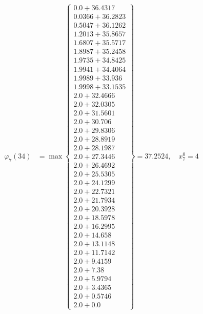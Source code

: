 \documentclass{article}
\begin{document}
\begin{align*}
\varphi_{7}(34) &= \max \left\{ \begin{array}{c}
0.0 + 36.4317 \\
 0.0366 + 36.2823 \\
 0.5047 + 36.1262 \\
 1.2013 + 35.8657 \\
 1.6807 + 35.5717 \\
 1.8987 + 35.2458 \\
 1.9735 + 34.8425 \\
 1.9941 + 34.4064 \\
 1.9989 + 33.936 \\
 1.9998 + 33.1535 \\
 2.0 + 32.4666 \\
 2.0 + 32.0305 \\
 2.0 + 31.5601 \\
 2.0 + 30.706 \\
 2.0 + 29.8306 \\
 2.0 + 28.8919 \\
 2.0 + 28.1987 \\
 2.0 + 27.3446 \\
 2.0 + 26.4692 \\
 2.0 + 25.5305 \\
 2.0 + 24.1299 \\
 2.0 + 22.7321 \\
 2.0 + 21.7934 \\
 2.0 + 20.3928 \\
 2.0 + 18.5978 \\
 2.0 + 16.2995 \\
 2.0 + 14.658 \\
 2.0 + 13.1148 \\
 2.0 + 11.7142 \\
 2.0 + 9.4159 \\
 2.0 + 7.38 \\
 2.0 + 5.9794 \\
 2.0 + 3.4365 \\
 2.0 + 0.5746 \\
 2.0 + 0.0
\end{array} \right\}=37.2524, \quad x_{7}^0=4\\
  

\end{align*}
\end{document}
